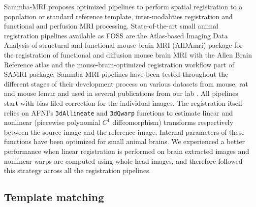 \documentclass[utf8, a4paper, final, crop]{frontiersSCNS}
\newcommand{\bashinline}[1]{\texttt{#1}}
\begin{document}
Sammba-MRI proposes optimized pipelines to perform spatial registration
to a population or standard reference template, inter-modalities
registration and functional and perfusion MRI processing.
State-of-the-art small animal registration pipelines available as FOSS
are the Atlas-based Imaging Data Analysis of structural and functional mouse
brain MRI (AIDAmri) \citep{pallast2019processing} package for the registration of functional and diffusion
mouse brain MRI with the Allen Brain Reference atlas and
the mouse-brain-optimized registration workflow \citep{ioanas2019optimized}
part of SAMRI package. 
Sammba-MRI pipelines have been tested throughout the different stages of their
development process on various datasets from mouse, rat and mouse lemur
and used in several publications from our lab \citep{garin2018resting, nadkarni20193d, garin2019resting}.
All pipelines start with bias filed correction for the individual images.
The registration itself relies on AFNI's \bashinline{3dAllineate} and \bashinline{3dQwarp} functions to 
estimate linear and nonlinear (piecewise polynomial $C^1$ diffeomorphism) transforms respectively between the source image
and the reference image. Internal parameters of these functions have been optimized for
small animal brains.
We experienced a better performance when linear registration
is performed on brain extracted images and nonlinear warps are computed
using whole head images, and therefore followed this strategy across all the 
registration pipelines.

\subsection{Template matching}
\end{document}
